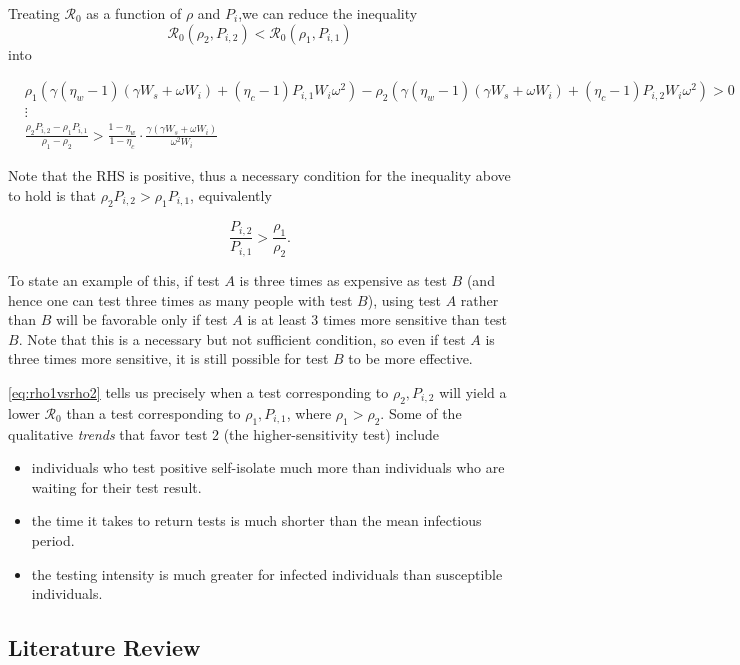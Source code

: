 \documentclass[12pt]{article}
\newcommand{\Rnum}{\mathcal{R}_0}
\theoremstyle{definition} %
\begin{document}
Treating $\Rnum$ as a function of $\rho$ and $P_i$,we can reduce the inequality $$\Rnum(\rho_2, P_{i,2}) < \Rnum(\rho_1, P_{i,1})$$ into 

\begin{align}\label{eq:rho1vsrho2}
    &\rho_1\left(\gamma(\eta_w-1)(\gamma W_s + \omega W_i) + (\eta_c-1)P_{i, 1}W_i\omega^2\right) - \rho_2\left(\gamma(\eta_w-1)(\gamma W_s + \omega W_i) + (\eta_c-1)P_{i, 2}W_i\omega^2\right) > 0 \nonumber \\
    &\vdots \nonumber \\
    &\frac{\rho_2P_{i, 2}-\rho_1P_{i, 1} }{\rho_1-\rho_2} > \frac{1-\eta_w}{1-\eta_c}\cdot \frac{\gamma(\gamma W_s + \omega W_i)}{\omega^2 W_i}
\end{align}

Note that the RHS is positive, thus a necessary condition for the inequality above to hold is that $\rho_2P_{i,2} > \rho_1P_{i,1}$, equivalently 

\begin{equation}
\frac{P_{i,2}}{P_{i,1}} > \frac{\rho_1}{\rho_2}.
\end{equation}

To state an example of this, if test $A$ is three times as expensive as test $B$ (and hence one can test three times as many people with test $B$), using test $A$ rather than $B$ will be favorable only if test $A$ is at least 3 times more sensitive than test $B$. Note that this is a necessary but not sufficient condition, so even if test $A$ is three times more sensitive, it is still possible for test $B$ to be more effective. 

\cref{eq:rho1vsrho2} tells us precisely when a test corresponding to $\rho_2, P_{i,2}$ will yield a lower $\Rnum$ than a test corresponding to $\rho_1, P_{i,1}$, where $\rho_1 > \rho_2$. Some of the qualitative \textit{trends} that favor test 2 (the higher-sensitivity test) include

\begin{itemize}
    \item individuals who test positive self-isolate much more than individuals who are waiting for their test result.
    \item the time it takes to return tests is much shorter than the mean infectious period.
    \item the testing intensity is much greater for infected individuals than susceptible individuals.
\end{itemize}


\subsection{Literature Review}
\end{document}

